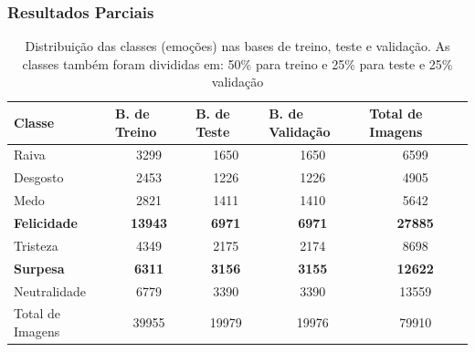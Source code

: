 \documentclass{beamer}
\begin{document}
\begin{frame}
\frametitle{Resultados Parciais}
\begin{table}[]
\tiny
\centering
\caption{Distribuição das classes (emoções) nas bases de treino, teste e validação. As classes também foram divididas em: 50\% para treino e 25\% para teste e 25\% validação}
\label{table:distclasse}
\begin{tabular}{lcccc}
\hline
\textbf{Classe}  & \multicolumn{1}{l}{\textbf{B. de Treino}} & \multicolumn{1}{l}{\textbf{B. de Teste}} & \multicolumn{1}{l}{\textbf{B. de Validação}} & \multicolumn{1}{l}{\textbf{Total de Imagens}} \\ \hline
Raiva            & 3299                                        & 1650                                       & 1650                                           & 6599                                          \\
Desgosto         & 2453                                        & 1226                                       & 1226                                           & 4905                                          \\
Medo             & 2821                                        & 1411                                       & 1410                                           & 5642                                          \\
\scriptsize \textbf{Felicidade}       & \scriptsize \textbf{13943}                                       & \scriptsize \textbf{6971}                                       & \scriptsize \textbf{6971}                                           & \scriptsize \textbf{27885}                                         \\
Tristeza         & 4349                                        & 2175                                       & 2174                                           & 8698                                          \\
\scriptsize \textbf{Surpesa}          & \scriptsize \textbf{6311}                                        & \scriptsize \textbf{3156}                                       & \scriptsize \textbf{3155}                                           & \scriptsize \textbf{12622}                                         \\
\scriptsize Neutralidade     & \scriptsize 6779                                        & \scriptsize 3390                                       & \scriptsize 3390                                           & \scriptsize 13559                                         \\
Total de Imagens & 39955                                       & 19979                                      & 19976                                          & 79910                                         \\ \hline
\end{tabular}
\end{table}
\end{frame}
\end{document}
